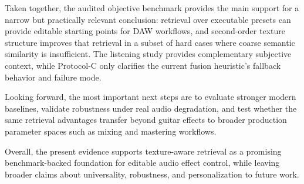 Taken together, the audited objective benchmark provides the main support for a narrow but practically relevant conclusion: retrieval over executable presets can provide editable starting points for DAW workflows, and second-order texture structure improves that retrieval in a subset of hard cases where coarse semantic similarity is insufficient. The listening study provides complementary subjective context, while Protocol-C only clarifies the current fusion heuristic's fallback behavior and failure mode.

Looking forward, the most important next steps are to evaluate stronger modern baselines, validate robustness under real audio degradation, and test whether the same retrieval advantages transfer beyond guitar effects to broader production parameter spaces such as mixing and mastering workflows.

Overall, the present evidence supports texture-aware retrieval as a promising benchmark-backed foundation for editable audio effect control, while leaving broader claims about universality, robustness, and personalization to future work.



